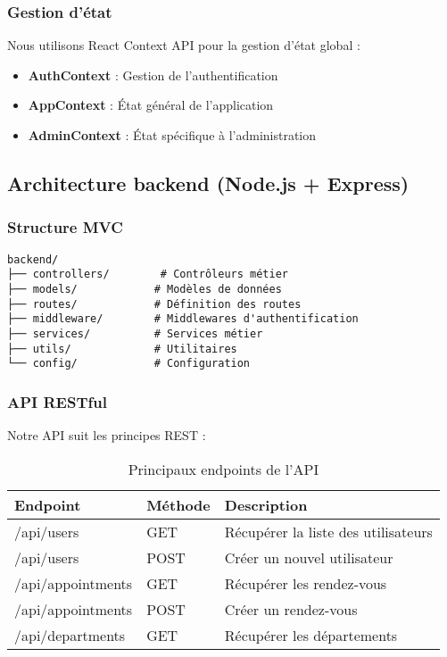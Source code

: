 \subsubsection{Gestion d'état}

Nous utilisons React Context API pour la gestion d'état global :
\begin{itemize}
    \item \textbf{AuthContext} : Gestion de l'authentification
    \item \textbf{AppContext} : État général de l'application
    \item \textbf{AdminContext} : État spécifique à l'administration
\end{itemize}

\subsection{Architecture backend (Node.js + Express)}

\subsubsection{Structure MVC}

\begin{lstlisting}[caption=Structure des dossiers backend]
backend/
├── controllers/        # Contrôleurs métier
├── models/            # Modèles de données
├── routes/            # Définition des routes
├── middleware/        # Middlewares d'authentification
├── services/          # Services métier
├── utils/             # Utilitaires
└── config/            # Configuration
\end{lstlisting}

\subsubsection{API RESTful}

Notre API suit les principes REST :

\begin{table}[h]
\centering
\begin{tabular}{|l|l|p{5cm}|}
\hline
\textbf{Endpoint} & \textbf{Méthode} & \textbf{Description} \\
\hline
/api/users & GET & Récupérer la liste des utilisateurs \\
\hline
/api/users & POST & Créer un nouvel utilisateur \\
\hline
/api/appointments & GET & Récupérer les rendez-vous \\
\hline
/api/appointments & POST & Créer un rendez-vous \\
\hline
/api/departments & GET & Récupérer les départements \\
\hline
\end{tabular}
\caption{Principaux endpoints de l'API}
\label{tab:api_endpoints}
\end{table}

